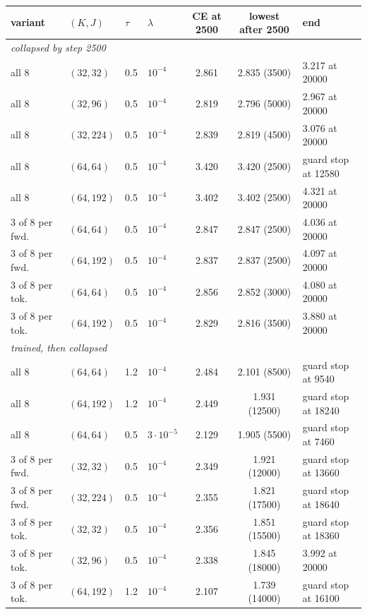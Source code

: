 \documentclass[11pt,a4paper]{article}
\begin{document}
\begin{center}
\small
\begin{tabular}{llllccl}
\toprule
variant & $(K,J)$ & $\tau$ & $\lambda$ & CE at 2500 & lowest after 2500 & end \\
\midrule
\multicolumn{7}{l}{\emph{collapsed by step 2500}}\\
all 8           & $(32,32)$  & 0.5 & $10^{-4}$ & 2.861 & 2.835 (3500)  & 3.217 at 20000 \\
all 8           & $(32,96)$  & 0.5 & $10^{-4}$ & 2.819 & 2.796 (5000)  & 2.967 at 20000 \\
all 8           & $(32,224)$ & 0.5 & $10^{-4}$ & 2.839 & 2.819 (4500)  & 3.076 at 20000 \\
all 8           & $(64,64)$  & 0.5 & $10^{-4}$ & 3.420 & 3.420 (2500)  & guard stop at 12580 \\
all 8           & $(64,192)$ & 0.5 & $10^{-4}$ & 3.402 & 3.402 (2500)  & 4.321 at 20000 \\
3 of 8 per fwd. & $(64,64)$  & 0.5 & $10^{-4}$ & 2.847 & 2.847 (2500)  & 4.036 at 20000 \\
3 of 8 per fwd. & $(64,192)$ & 0.5 & $10^{-4}$ & 2.837 & 2.837 (2500)  & 4.097 at 20000 \\
3 of 8 per tok. & $(64,64)$  & 0.5 & $10^{-4}$ & 2.856 & 2.852 (3000)  & 4.080 at 20000 \\
3 of 8 per tok. & $(64,192)$ & 0.5 & $10^{-4}$ & 2.829 & 2.816 (3500)  & 3.880 at 20000 \\
\midrule
\multicolumn{7}{l}{\emph{trained, then collapsed}}\\
all 8           & $(64,64)$  & 1.2 & $10^{-4}$        & 2.484 & 2.101 (8500)  & guard stop at 9540 \\
all 8           & $(64,192)$ & 1.2 & $10^{-4}$        & 2.449 & 1.931 (12500) & guard stop at 18240 \\
all 8           & $(64,64)$  & 0.5 & $3\cdot10^{-5}$  & 2.129 & 1.905 (5500)  & guard stop at 7460 \\
3 of 8 per fwd. & $(32,32)$  & 0.5 & $10^{-4}$        & 2.349 & 1.921 (12000) & guard stop at 13660 \\
3 of 8 per fwd. & $(32,224)$ & 0.5 & $10^{-4}$        & 2.355 & 1.821 (17500) & guard stop at 18640 \\
3 of 8 per tok. & $(32,32)$  & 0.5 & $10^{-4}$        & 2.356 & 1.851 (15500) & guard stop at 18360 \\
3 of 8 per tok. & $(32,96)$  & 0.5 & $10^{-4}$        & 2.338 & 1.845 (18000) & 3.992 at 20000 \\
3 of 8 per tok. & $(64,192)$ & 1.2 & $10^{-4}$        & 2.107 & 1.739 (14000) & guard stop at 16100 \\
\bottomrule
\end{tabular}
\end{center}
\end{document}
